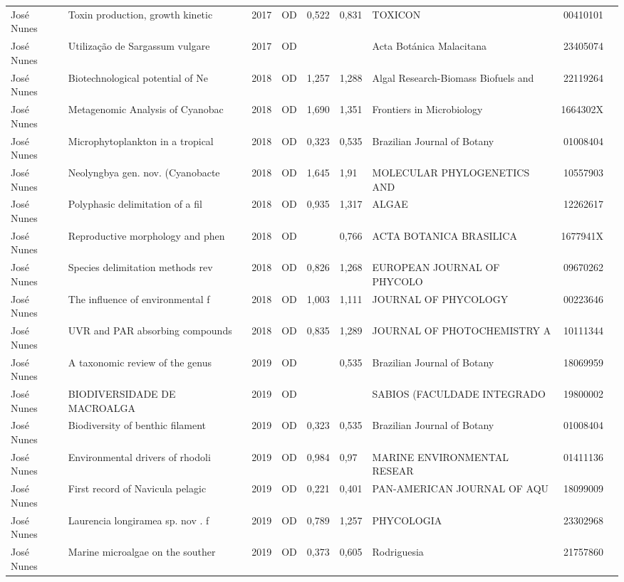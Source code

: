 \documentclass[12pt,brazil]{article}\usepackage[]{graphicx}\usepackage[]{xcolor}
\begin{document}
\begin{longtable}{lllrrllrr}
José Nunes & Toxin production, growth kinetic & 2017 & OD & 0,522 & 0,831 & TOXICON & 00410101 \\
José Nunes & Utilização de Sargassum vulgare  & 2017 & OD &  &  & Acta Botánica Malacitana & 23405074 \\
José Nunes & Biotechnological potential of Ne & 2018 & OD & 1,257 & 1,288 & Algal Research-Biomass Biofuels and  & 22119264 \\
José Nunes & Metagenomic Analysis of Cyanobac & 2018 & OD & 1,690 & 1,351 & Frontiers in Microbiology & 1664302X \\
José Nunes & Microphytoplankton in a tropical & 2018 & OD & 0,323 & 0,535 & Brazilian Journal of Botany & 01008404 \\
José Nunes & Neolyngbya gen. nov. (Cyanobacte & 2018 & OD & 1,645 & 1,91 & MOLECULAR PHYLOGENETICS AND & 10557903 \\
José Nunes & Polyphasic delimitation of a fil & 2018 & OD & 0,935 & 1,317 & ALGAE & 12262617 \\
José Nunes & Reproductive morphology and phen & 2018 & OD &  & 0,766 & ACTA BOTANICA BRASILICA & 1677941X \\
José Nunes & Species delimitation methods rev & 2018 & OD & 0,826 & 1,268 & EUROPEAN JOURNAL OF PHYCOLO & 09670262 \\
José Nunes & The influence of environmental f & 2018 & OD & 1,003 & 1,111 & JOURNAL OF PHYCOLOGY & 00223646 \\
José Nunes & UVR and PAR absorbing compounds  & 2018 & OD & 0,835 & 1,289 & JOURNAL OF PHOTOCHEMISTRY A & 10111344 \\
José Nunes & A taxonomic review of the genus  & 2019 & OD &  & 0,535 & Brazilian Journal of Botany & 18069959 \\
José Nunes & BIODIVERSIDADE DE MACROALGA & 2019 & OD &  &  & SABIOS (FACULDADE INTEGRADO & 19800002 \\
José Nunes & Biodiversity of benthic filament & 2019 & OD & 0,323 & 0,535 & Brazilian Journal of Botany & 01008404 \\
José Nunes & Environmental drivers of rhodoli & 2019 & OD & 0,984 & 0,97 & MARINE ENVIRONMENTAL RESEAR & 01411136 \\
José Nunes & First record of Navicula pelagic & 2019 & OD & 0,221 & 0,401 & PAN-AMERICAN JOURNAL OF AQU & 18099009 \\
José Nunes & Laurencia longiramea sp. nov . f & 2019 & OD & 0,789 & 1,257 & PHYCOLOGIA & 23302968 \\
José Nunes & Marine microalgae on the souther & 2019 & OD & 0,373 & 0,605 & Rodriguesia & 21757860 \\

\end{longtable}
\end{document}
